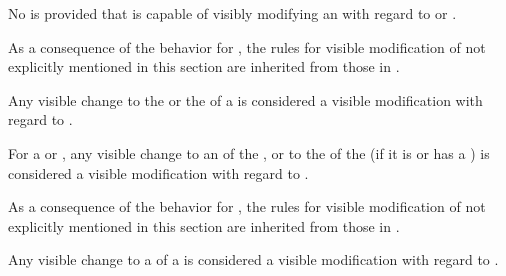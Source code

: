
No   is provided that is capable of visibly
modifying an  with regard to  or .

\endsubsubsection%


As a consequence of the behavior for ,
the rules for visible modification of  not explicitly mentioned in this
section are inherited from those in \secref\VisModEQL.
 

Any visible change to the  or the  of a 
is considered a visible modification with regard to .
 
\endsubsubsubsection%


For a   or , any visible change
     to an   of the ,
  or to the  of the  (if it is  
					           or has a )
is considered a visible modification with regard to .
 
\endsubsubsubsection%

\endsubsubsection%


As a consequence of the behavior for ,
the rules for visible modification of  not explicitly mentioned in this
section are inherited from those in \secref\VisModEQUAL.


Any visible change to a  of a 
is considered a visible modification with regard to .
 
